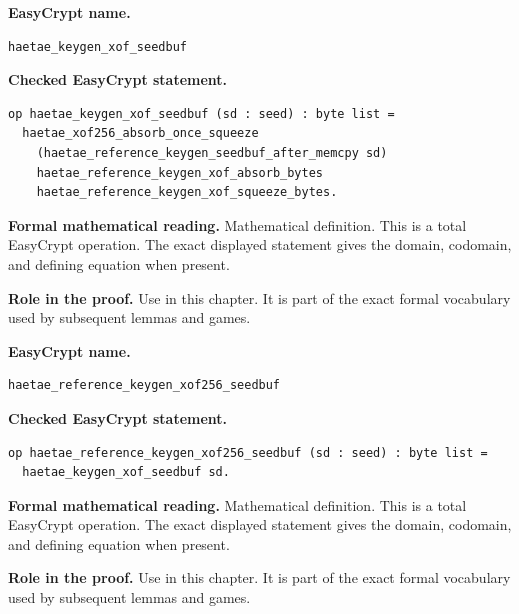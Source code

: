 \begin{formaldefinition}
\noindent\textbf{EasyCrypt name.}
\begin{lstlisting}[language=EasyCrypt,basicstyle=\ttfamily\scriptsize]
haetae_keygen_xof_seedbuf
\end{lstlisting}
\noindent\textbf{Checked EasyCrypt statement.}
\begin{lstlisting}[language=EasyCrypt,basicstyle=\ttfamily\scriptsize]
op haetae_keygen_xof_seedbuf (sd : seed) : byte list =
  haetae_xof256_absorb_once_squeeze
    (haetae_reference_keygen_seedbuf_after_memcpy sd)
    haetae_reference_keygen_xof_absorb_bytes
    haetae_reference_keygen_xof_squeeze_bytes.
\end{lstlisting}
\noindent\textbf{Formal mathematical reading.}
Mathematical definition. This is a total EasyCrypt operation.  The exact displayed statement gives the domain, codomain, and defining equation when present.

\noindent\textbf{Role in the proof.}
Use in this chapter. It is part of the exact formal vocabulary used by subsequent lemmas and games.

\end{formaldefinition}

\begin{formaldefinition}
\noindent\textbf{EasyCrypt name.}
\begin{lstlisting}[language=EasyCrypt,basicstyle=\ttfamily\scriptsize]
haetae_reference_keygen_xof256_seedbuf
\end{lstlisting}
\noindent\textbf{Checked EasyCrypt statement.}
\begin{lstlisting}[language=EasyCrypt,basicstyle=\ttfamily\scriptsize]
op haetae_reference_keygen_xof256_seedbuf (sd : seed) : byte list =
  haetae_keygen_xof_seedbuf sd.
\end{lstlisting}
\noindent\textbf{Formal mathematical reading.}
Mathematical definition. This is a total EasyCrypt operation.  The exact displayed statement gives the domain, codomain, and defining equation when present.

\noindent\textbf{Role in the proof.}
Use in this chapter. It is part of the exact formal vocabulary used by subsequent lemmas and games.

\end{formaldefinition}

